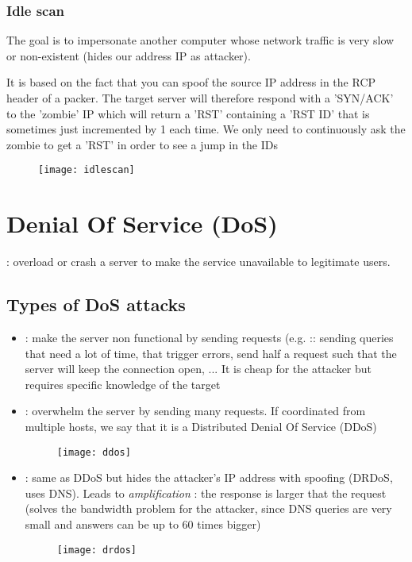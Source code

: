 \subsection{Idle scan}

The goal is to impersonate another computer whose network traffic is very slow or non-existent (hides our address IP as attacker).

It is based on the fact that you can spoof the source IP address in the RCP header of a packer. The target server will therefore respond with a 'SYN/ACK' to the 'zombie' IP which will return a 'RST' containing a 'RST ID' that is sometimes just incremented by 1 each time. We only need to continuously ask the zombie to get a 'RST' in order to see a jump in the IDs

\begin{figure}[H]
    \centering
    \texttt{[image: idlescan]}
\end{figure}

\chapter{Denial Of Service (DoS)}

 : overload or crash a server to make the service unavailable to legitimate users.

\section{Types of DoS attacks}

\begin{itemize}
    \item {} : make the server non functional by sending requests (e.g. :: sending queries that need a lot of time, that trigger errors, send half a request such that the server will keep the connection open, ... It is cheap for the attacker but requires specific knowledge of the target
    \item {} : overwhelm the server by sending many requests. If coordinated from multiple hosts, we say that it is a Distributed Denial Of Service (DDoS) 
    \begin{figure}[H]
        \centering
        \texttt{[image: ddos]}
    \end{figure}
    \item {} : same as DDoS but hides the attacker's IP address with spoofing (DRDoS, uses DNS). Leads to \textit{amplification} : the response is larger that the request (solves the bandwidth problem for the attacker, since DNS queries are very small and answers can be up to 60 times bigger)
    \begin{figure}[H]
        \centering
        \texttt{[image: drdos]}
    \end{figure}
\end{itemize}

